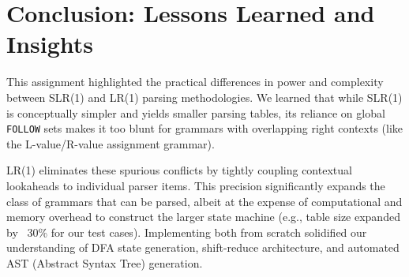 \documentclass[11pt,a4paper]{article}
\begin{document}
\section{Conclusion: Lessons Learned and Insights}
This assignment highlighted the practical differences in power and complexity between SLR(1) and LR(1) parsing methodologies. We learned that while SLR(1) is conceptually simpler and yields smaller parsing tables, its reliance on global \texttt{FOLLOW} sets makes it too blunt for grammars with overlapping right contexts (like the L-value/R-value assignment grammar). 

LR(1) eliminates these spurious conflicts by tightly coupling contextual lookaheads to individual parser items. This precision significantly expands the class of grammars that can be parsed, albeit at the expense of computational and memory overhead to construct the larger state machine (e.g., table size expanded by ~30\% for our test cases). Implementing both from scratch solidified our understanding of DFA state generation, shift-reduce architecture, and automated AST (Abstract Syntax Tree) generation.
\end{document}
